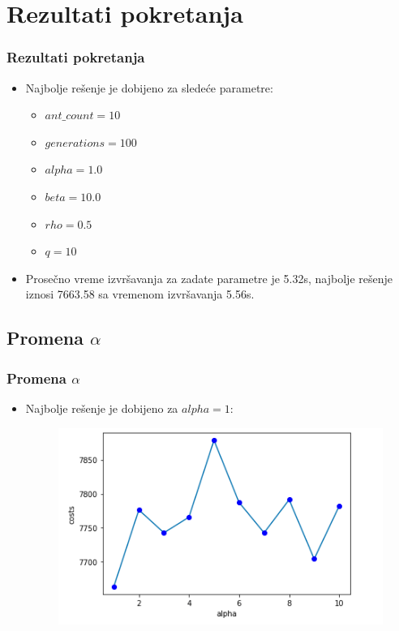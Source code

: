 \documentclass[11pt]{beamer}
\begin{document}
\section{Rezultati pokretanja}
\begin{frame}{}
\frametitle{Rezultati pokretanja}
\begin{itemize}
  \item Najbolje rešenje je dobijeno za sledeće parametre:
	\begin{itemize}
		\item $ant\_count = 10$
		\item $generations = 100$
		\item $alpha = 1.0$
		\item $beta = 10.0$
		\item $rho = 0.5$
		\item $q = 10$

	\end{itemize}
	\item Prosečno vreme izvršavanja za zadate parametre je 5.32s, najbolje rešenje iznosi 7663.58 sa vremenom izvršavanja 5.56s.

\end{itemize}
\end{frame}

\subsection{Promena $\alpha$}
\begin{frame}{}
\frametitle{Promena $\alpha$}
\begin{itemize}
  \item Najbolje rešenje je dobijeno za $alpha = 1$:
	 \begin{figure}[h!]
		\begin{center}
			\includegraphics[scale=0.3]{alpha.png}
		\end{center}
		\label{fig:optres}
	\end{figure}

\end{itemize}
\end{frame}
\end{document}
